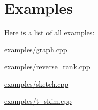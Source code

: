 \section{Examples}
Here is a list of all examples\+:\begin{DoxyCompactItemize}
\item 
\hyperlink{examples_2graph_8cpp-example}{examples/graph.\+cpp}
\item 
\hyperlink{examples_2reverse_rank_8cpp-example}{examples/reverse\+\_\+rank.\+cpp}
\item 
\hyperlink{examples_2sketch_8cpp-example}{examples/sketch.\+cpp}
\item 
\hyperlink{examples_2t_skim_8cpp-example}{examples/t\+\_\+skim.\+cpp}
\end{DoxyCompactItemize}
